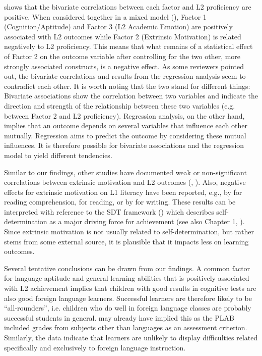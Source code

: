 \documentclass[output=paper]{langsci/langscibook}
\begin{document}
 shows that the bivariate correlations between each factor and L2 proficiency are positive. When considered together in a mixed model (), Factor 1 (Cognition/Aptitude) and Factor 3 (L2 Academic Emotion) are positively associated with L2 outcomes while Factor 2 (Extrinsic Motivation) is related negatively to L2 proficiency. This means that what remains of a statistical effect of Factor 2 on the outcome variable after controlling for the two other, more strongly associated constructs, is a negative effect. As some reviewers pointed out, the bivariate correlations and results from the regression analysis seem to contradict each other. It is worth noting that the two stand for different things: Bivariate associations show the correlation between two variables and indicate the direction and strength of the relationship between these two variables (e.g. between Factor 2 and L2 proficiency). Regression analysis, on the other hand, implies that an outcome depends on several variables that influence each other mutually. Regression aims to predict the outcome by considering these mutual influences. It is therefore possible for bivariate associations and the regression model to yield different tendencies.

\begin{sloppypar}
Similar to our findings, other studies have documented weak or non-significant correlations between extrinsic motivation and L2 outcomes (\citealt[18]{HusfeldtLehmann2009}, \citealt[31]{KreisEtAl2014}). Also, negative effects for extrinsic motivation on L1 literacy have been reported, e.g., by \citet{WangGuthrie2004} for reading comprehension, \citet{BeckerEtAl2010} for reading, or by \citet{PajaresEtAl2009} for writing. These results can be interpreted with reference to the SDT framework (\citealt{DeciRyan2002}) which describes self-determination as a major driving force for achievement (see also Chapter 1, ). Since extrinsic motivation is not usually related to self-determination, but rather stems from some external source, it is plausible that it impacts less on learning outcomes.
\end{sloppypar}

Several tentative conclusions can be drawn from our findings. A common factor for language aptitude and general learning abilities that is positively associated with L2 achievement implies that children with good results in cognitive tests are also good foreign language learners. Successful learners are therefore likely to be “all-rounders”, i.e. children who do well in foreign language classes are probably successful students in general. \citet{Pimsleur1966} may already have implied this as the PLAB included grades from subjects other than languages as an assessment criterion. Similarly, the data indicate that learners are unlikely to display difficulties related specifically and exclusively to foreign language instruction.
\end{document}
